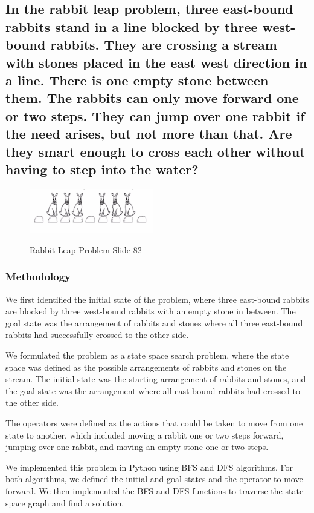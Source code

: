 \documentclass[15pt,journal]{IEEEtran}
\begin{document}
\subsection{In the rabbit leap problem, three east-bound rabbits stand in a line blocked by three west-bound rabbits. They are crossing a stream with stones placed in the east west direction in a line. There is one empty stone between them. The rabbits can only move forward one or two steps. They can jump over one rabbit if the need arises, but not more than that. Are they smart enough to cross each other without having to step into the water? 
}
\begin{figure}[H]%
\begin {center}
\href{https://www.slideshare.net/KrishnaMadala1/ch-2-state-space-search-slides-part-1pdf}
{\includegraphics[width=0.48\textwidth]{image/Rabbit.jpg}}
\caption{ \cite{krishna}Rabbit Leap Problem Slide 82} %
\label{fig:ecg}
\end {center}
\end{figure}
\subsubsection{\large{Methodology}\\}
We first identified the initial state of the problem, where three east-bound rabbits are blocked by three west-bound rabbits with an empty stone in between. The goal state was the arrangement of rabbits and stones where all three east-bound rabbits had successfully crossed to the other side.

We formulated the problem as a state space search problem, where the state space was defined as the possible arrangements of rabbits and stones on the stream. The initial state was the starting arrangement of rabbits and stones, and the goal state was the arrangement where all east-bound rabbits had crossed to the other side.

The operators were defined as the actions that could be taken to move from one state to another, which included moving a rabbit one or two steps forward, jumping over one rabbit, and moving an empty stone one or two steps.

We implemented this problem in Python using BFS and DFS algorithms. For both algorithms, we defined the initial and goal states and the operator to move forward. We then implemented the BFS and DFS functions to traverse the state space graph and find a solution.
\end{document}
